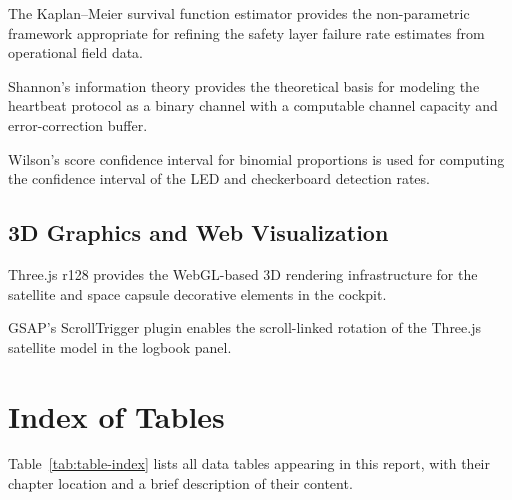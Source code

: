\textbf{\cite{kaplan1958nonparametric}} The Kaplan--Meier survival function estimator provides the non-parametric framework appropriate for refining the safety layer failure rate estimates from operational field data.

\textbf{\cite{shannon1948mathematical}} Shannon's information theory provides the theoretical basis for modeling the heartbeat protocol as a binary channel with a computable channel capacity and error-correction buffer.

\textbf{\cite{wilson1927probable}} Wilson's score confidence interval for binomial proportions is used for computing the confidence interval of the LED and checkerboard detection rates.

\subsection{3D Graphics and Web Visualization}

\textbf{\cite{cabello2021threejs}} Three.js r128 provides the WebGL-based 3D rendering infrastructure for the satellite and space capsule decorative elements in the cockpit.

\textbf{\cite{greensock2021gsap}} GSAP's ScrollTrigger plugin enables the scroll-linked rotation of the Three.js satellite model in the logbook panel.

\section{Index of Tables}

Table~\ref{tab:table-index} lists all data tables appearing in this report, with their chapter location and a brief description of their content.

